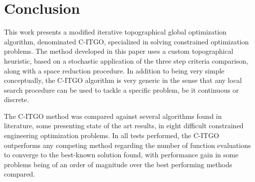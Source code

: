 \section{Conclusion} \label{sec:Conclusion}

This work presents a modified iterative topographical global optimization algorithm, denominated C-ITGO, specialized in solving constrained optimization problems. The method developed in this paper uses a custom topographical heuristic, based on a stochastic application of the three step criteria comparison, along with a space reduction procedure. In addition to being very simple conceptually, the C-ITGO algorithm is very generic in the sense that any local search procedure can be used to tackle a specific problem, be it continuous or discrete.

The C-ITGO method was compared against several algorithms found in literature, some presenting state of the art results, in eight difficult constrained engineering optimization problems. In all tests performed, the C-ITGO outperforms any competing method regarding the number of function evaluations to converge to the best-known solution found, with performance gain in some problems being of an order of magnitude over the best performing methods compared.
